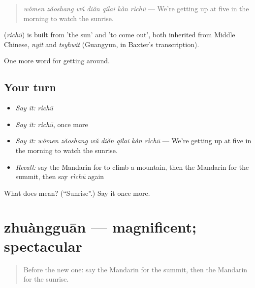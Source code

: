 \begin{quote}
\textbf{} \emph{wǒmen zǎoshang wǔ diǎn qǐlai kàn rìchū} — We're getting up at five in the morning to watch the sunrise.
\end{quote}

\begin{cousinweb}
\textbf{} (\emph{rìchū}) is built from  'the sun' and  'to come out', both inherited from Middle Chinese, \emph{nyit} and \emph{tsyhwit} (Guangyun, in Baxter's transcription).
\end{cousinweb}

\begin{grammarlens}[title={What you've built}]
One more word for getting around.
\end{grammarlens}

\subsection*{Your turn}
\begin{itemize}
\raggedright
  \item \emph{Say it:} \emph{rìchū}
  \item \emph{Say it:} \emph{rìchū}, once more
  \item \emph{Say it:} \emph{wǒmen zǎoshang wǔ diǎn qǐlai kàn rìchū} — We're getting up at five in the morning to watch the sunrise.
  \item \emph{Recall:} say the Mandarin for to climb a mountain, then the Mandarin for the summit, then say \emph{rìchū} again
\end{itemize}

\begin{tcolorbox}[breakable,colback=teal!4,colframe=teal!35!black,title={Before you move on}]
What does  mean? (\textquotedblleft{}Sunrise\textquotedblright{}.) Say it once more.
\end{tcolorbox}
\section[zhuàngguān]{zhuàngguān — magnificent; spectacular}

\label{lesson:ZH-C435-zhuangguan}



\begin{quote}
Before the new one: say the Mandarin for the summit, then the Mandarin for the sunrise.
\end{quote}

